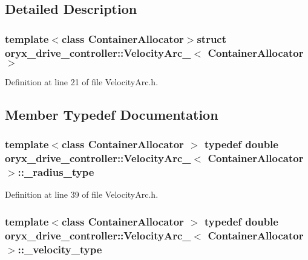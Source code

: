\subsection{\-Detailed \-Description}
\subsubsection*{template$<$class Container\-Allocator$>$struct oryx\-\_\-drive\-\_\-controller\-::\-Velocity\-Arc\-\_\-$<$ Container\-Allocator $>$}



\-Definition at line 21 of file \-Velocity\-Arc.\-h.



\subsection{\-Member \-Typedef \-Documentation}
\subsubsection[{\-\_\-radius\-\_\-type}]{\setlength{\rightskip}{0pt plus 5cm}template$<$class Container\-Allocator $>$ typedef double {\bf oryx\-\_\-drive\-\_\-controller\-::\-Velocity\-Arc\-\_\-}$<$ \-Container\-Allocator $>$\-::{\bf \-\_\-radius\-\_\-type}}\label{structoryx__drive__controller_1_1VelocityArc___ad1e0b03fdbebc0f9b70322869d9c0931}


\-Definition at line 39 of file \-Velocity\-Arc.\-h.

\subsubsection[{\-\_\-velocity\-\_\-type}]{\setlength{\rightskip}{0pt plus 5cm}template$<$class Container\-Allocator $>$ typedef double {\bf oryx\-\_\-drive\-\_\-controller\-::\-Velocity\-Arc\-\_\-}$<$ \-Container\-Allocator $>$\-::{\bf \-\_\-velocity\-\_\-type}}\label{structoryx__drive__controller_1_1VelocityArc___a46c07ef4e29d470bcbd03d6b8032a38f}


